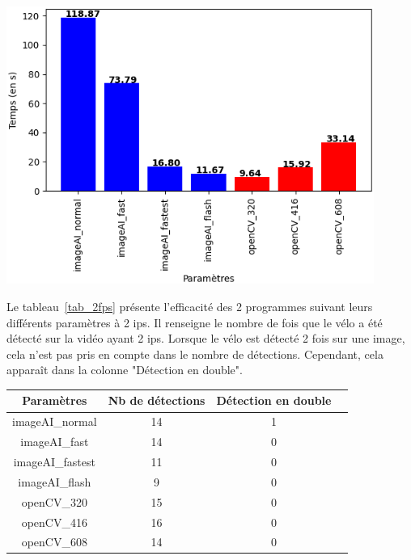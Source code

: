 \begin{center}
    \centering
    \includegraphics[width=0.9\textwidth]{img/result_2fps.png}
\end{center}

Le tableau~\ref{tab_2fps} présente l'efficacité des 2 programmes suivant leurs différents paramètres à 2 ips.
Il renseigne le nombre de fois que le vélo a été détecté sur la vidéo ayant 2 ips.
Lorsque le vélo est détecté 2 fois sur une image, cela n'est pas pris en compte dans le nombre de détections.
Cependant, cela apparaît dans la colonne "Détection en double".

\begin{center}
    \begin{tabular}{|c|c|c|c|}
        \hline
        \rowcolor{tableColorDark} Paramètres & Nb de détections & Détection en double \\
        \hline 

        imageAI\_normal                      &        14        &         1           \\\hline
        imageAI\_fast                        &        14        &         0           \\\hline
        imageAI\_fastest                     &        11        &         0           \\\hline
        imageAI\_flash                       &        9         &         0           \\\hline
        openCV\_320                          &        15        &         0           \\\hline
        openCV\_416                          &        16        &         0           \\\hline
        openCV\_608                          &        14        &         0           \\\hline
    \end{tabular}
    \label{tab_2fps}
\end{center}

